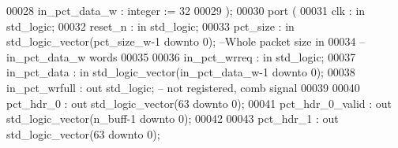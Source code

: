 \begin{DoxyCode}
00028       \textcolor{vhdlchar}{in_pct_data_w}     \textcolor{vhdlchar}{:} \textcolor{comment}{integer} \textcolor{vhdlchar}{:=} \textcolor{vhdllogic}{}\textcolor{vhdllogic}{32}
00029    \textcolor{vhdlchar}{)};
00030    \textcolor{keywordflow}{port} \textcolor{vhdlchar}{(}
00031       \textcolor{vhdlchar}{clk}               \textcolor{vhdlchar}{:} \textcolor{keywordflow}{in} \textcolor{comment}{std\_logic};
00032       \textcolor{vhdlchar}{reset_n}           \textcolor{vhdlchar}{:} \textcolor{keywordflow}{in} \textcolor{comment}{std\_logic};
00033       \textcolor{vhdlchar}{pct_size}          \textcolor{vhdlchar}{:} \textcolor{keywordflow}{in} \textcolor{comment}{std\_logic\_vector}\textcolor{vhdlchar}{(}\textcolor{vhdlchar}{pct_size_w}\textcolor{vhdlchar}{-}\textcolor{vhdllogic}{}\textcolor{vhdllogic}{1} \textcolor{keywordflow}{downto} \textcolor{vhdllogic}{}\textcolor{vhdllogic}{0}\textcolor{vhdlchar}{)};\textcolor{keyword}{   --Whole packet size in }
00034 \textcolor{keyword}{                                                                        --in\_pct\_data\_w words}
00035       
00036       \textcolor{vhdlchar}{in_pct_wrreq}      \textcolor{vhdlchar}{:} \textcolor{keywordflow}{in} \textcolor{comment}{std\_logic};
00037       \textcolor{vhdlchar}{in_pct_data}       \textcolor{vhdlchar}{:} \textcolor{keywordflow}{in} \textcolor{comment}{std\_logic\_vector}\textcolor{vhdlchar}{(}\textcolor{vhdlchar}{in_pct_data_w}\textcolor{vhdlchar}{-}\textcolor{vhdllogic}{}\textcolor{vhdllogic}{1} \textcolor{keywordflow}{downto} \textcolor{vhdllogic}{}\textcolor{vhdllogic}{0}\textcolor{vhdlchar}{)};
00038       \textcolor{vhdlchar}{in_pct_wrfull}     \textcolor{vhdlchar}{:} \textcolor{keywordflow}{out} \textcolor{comment}{std\_logic};\textcolor{keyword}{ -- not registered, comb signal }
00039       
00040       \textcolor{vhdlchar}{pct_hdr_0}         \textcolor{vhdlchar}{:} \textcolor{keywordflow}{out} \textcolor{comment}{std\_logic\_vector}\textcolor{vhdlchar}{(}\textcolor{vhdllogic}{}\textcolor{vhdllogic}{63} \textcolor{keywordflow}{downto} \textcolor{vhdllogic}{}\textcolor{vhdllogic}{0}\textcolor{vhdlchar}{)};
00041       \textcolor{vhdlchar}{pct_hdr_0_valid}   \textcolor{vhdlchar}{:} \textcolor{keywordflow}{out} \textcolor{comment}{std\_logic\_vector}\textcolor{vhdlchar}{(}\textcolor{vhdlchar}{n_buff}\textcolor{vhdlchar}{-}\textcolor{vhdllogic}{}\textcolor{vhdllogic}{1} \textcolor{keywordflow}{downto} \textcolor{vhdllogic}{}\textcolor{vhdllogic}{0}\textcolor{vhdlchar}{)};
00042       
00043       \textcolor{vhdlchar}{pct_hdr_1}         \textcolor{vhdlchar}{:} \textcolor{keywordflow}{out} \textcolor{comment}{std\_logic\_vector}\textcolor{vhdlchar}{(}\textcolor{vhdllogic}{}\textcolor{vhdllogic}{63} \textcolor{keywordflow}{downto} \textcolor{vhdllogic}{}\textcolor{vhdllogic}{0}\textcolor{vhdlchar}{)};

\end{DoxyCode}
